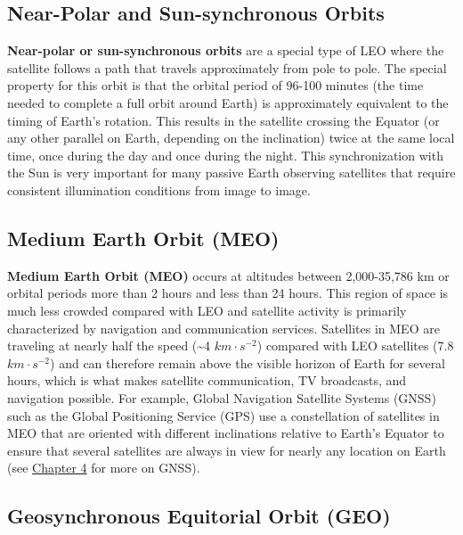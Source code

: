 \documentclass[
]{book}
\begin{document}
\subsection{Near-Polar and Sun-synchronous Orbits}\label{near-polar-and-sun-synchronous-orbits}

\textbf{Near-polar or sun-synchronous orbits} are a special type of LEO where the satellite follows a path that travels approximately from pole to pole. The special property for this orbit is that the orbital period of 96-100 minutes (the time needed to complete a full orbit around Earth) is approximately equivalent to the timing of Earth's rotation. This results in the satellite crossing the Equator (or any other parallel on Earth, depending on the inclination) twice at the same local time, once during the day and once during the night. This synchronization with the Sun is very important for many passive Earth observing satellites that require consistent illumination conditions from image to image.

\subsection{Medium Earth Orbit (MEO)}\label{medium-earth-orbit-meo}

\textbf{Medium Earth Orbit (MEO)} occurs at altitudes between 2,000-35,786 km or orbital periods more than 2 hours and less than 24 hours. This region of space is much less crowded compared with LEO and satellite activity is primarily characterized by navigation and communication services. Satellites in MEO are traveling at nearly half the speed (\textasciitilde4 \(km·s^{-2}\)) compared with LEO satellites (7.8 \(km·s^{-2}\)) and can therefore remain above the visible horizon of Earth for several hours, which is what makes satellite communication, TV broadcasts, and navigation possible. For example, Global Navigation Satellite Systems (GNSS) such as the Global Positioning Service (GPS) use a constellation of satellites in MEO that are oriented with different inclinations relative to Earth's Equator to ensure that several satellites are always in view for nearly any location on Earth (see \href{https://ubc-geomatics-textbook.github.io/geomatics-textbook/collecting-and-editing-data.html}{Chapter 4} for more on GNSS).

\subsection{Geosynchronous Equitorial Orbit (GEO)}\label{geosynchronous-equitorial-orbit-geo}
\end{document}
